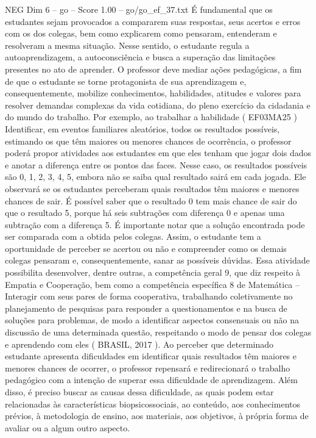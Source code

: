 \begin{textsample}{NEG Dim 6 – go – Score 1.00 – go/go\_ef\_37.txt}  \label{ex:f6_neg_180}
É fundamental que os estudantes sejam provocados a compararem suas respostas, seus acertos e erros com os dos colegas, bem como explicarem como pensaram, entenderam e resolveram a mesma situação.
Nesse sentido, o estudante regula a autoaprendizagem, a autoconsciência e busca a superação das limitações presentes no ato de aprender.
O professor deve mediar ações pedagógicas, a fim de que o estudante se torne protagonista de sua aprendizagem e, consequentemente, mobilize conhecimentos, habilidades, atitudes e valores para resolver demandas complexas da vida cotidiana, do pleno exercício da cidadania e do mundo do trabalho.
Por exemplo, ao trabalhar a habilidade ( EF03MA25 ) Identificar, em eventos familiares aleatórios, todos os resultados possíveis, estimando os que têm maiores ou menores chances de ocorrência, o professor poderá propor atividades aos estudantes em que eles tenham que jogar dois dados e anotar a diferença entre os pontos das faces.
Nesse caso, os resultados possíveis são 0, 1, 2, 3, 4, 5, embora não se saiba qual resultado sairá em cada jogada.
Ele observará se os estudantes perceberam quais resultados têm maiores e menores chances de sair.
É possível saber que o resultado 0 tem mais chance de sair do que o resultado 5, porque há seis subtrações com diferença 0 e apenas uma subtração com a diferença 5.
É importante notar que a solução encontrada pode ser comparada com a obtida pelos colegas.
Assim, o estudante tem a oportunidade de perceber se acertou ou não e compreender como os demais colegas pensaram e, consequentemente, sanar as possíveis dúvidas.
Essa atividade possibilita desenvolver, dentre outras, a competência geral 9, que diz respeito à Empatia e Cooperação, bem como a competência específica 8 de Matemática – Interagir com seus pares de forma cooperativa, trabalhando coletivamente no planejamento de pesquisas para responder a questionamentos e na busca de soluções para problemas, de modo a identificar aspectos consensuais ou não na discussão de uma determinada questão, respeitando o modo de pensar dos colegas e aprendendo com eles ( BRASIL, 2017 ).
Ao perceber que determinado estudante apresenta dificuldades em identificar quais resultados têm maiores e menores chances de ocorrer, o professor repensará e redirecionará o trabalho pedagógico com a intenção de superar essa dificuldade de aprendizagem.
Além disso, é preciso buscar as causas dessa dificuldade, as quais podem estar relacionadas às características biopsicossociais, ao conteúdo, aos conhecimentos prévios, à metodologia de ensino, aos materiais, aos objetivos, à própria forma de avaliar ou a algum outro aspecto.

\end{textsample}
